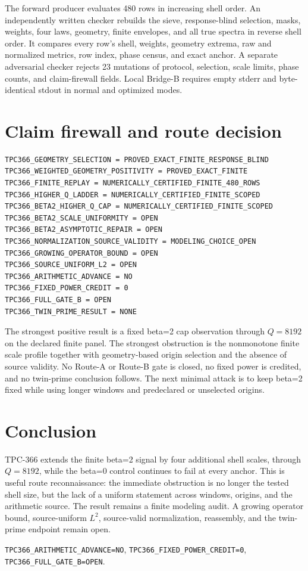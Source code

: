 \documentclass[10pt]{article}
\begin{document}
The forward producer evaluates 480 rows in increasing shell order.  An
independently written checker rebuilds the sieve, response-blind selection,
masks, weights, four laws, geometry, finite envelopes, and all true spectra
in reverse shell order.  It compares every row's shell, weights, geometry
extrema, raw and normalized metrics, row index, phase census, and exact
anchor.  A separate adversarial checker rejects 23 mutations of protocol,
selection, scale limits, phase counts, and claim-firewall fields.  Local
Bridge-B requires empty stderr and byte-identical stdout in normal and
optimized modes.

\section{Claim firewall and route decision}

\begin{verbatim}
TPC366_GEOMETRY_SELECTION = PROVED_EXACT_FINITE_RESPONSE_BLIND
TPC366_WEIGHTED_GEOMETRY_POSITIVITY = PROVED_EXACT_FINITE
TPC366_FINITE_REPLAY = NUMERICALLY_CERTIFIED_FINITE_480_ROWS
TPC366_HIGHER_Q_LADDER = NUMERICALLY_CERTIFIED_FINITE_SCOPED
TPC366_BETA2_HIGHER_Q_CAP = NUMERICALLY_CERTIFIED_FINITE_SCOPED
TPC366_BETA2_SCALE_UNIFORMITY = OPEN
TPC366_BETA2_ASYMPTOTIC_REPAIR = OPEN
TPC366_NORMALIZATION_SOURCE_VALIDITY = MODELING_CHOICE_OPEN
TPC366_GROWING_OPERATOR_BOUND = OPEN
TPC366_SOURCE_UNIFORM_L2 = OPEN
TPC366_ARITHMETIC_ADVANCE = NO
TPC366_FIXED_POWER_CREDIT = 0
TPC366_FULL_GATE_B = OPEN
TPC366_TWIN_PRIME_RESULT = NONE
\end{verbatim}

The strongest positive result is a fixed beta=2 cap observation through
$Q=8192$ on the declared finite panel.  The strongest obstruction is the
nonmonotone finite scale profile together with geometry-based origin
selection and the absence of source validity.  No Route-A or Route-B gate is
closed, no fixed power is credited, and no twin-prime conclusion follows.
The next minimal attack is to keep beta=2 fixed while using longer windows
and predeclared or unselected origins.

\section{Conclusion}

TPC-366 extends the finite beta=2 signal by four additional shell scales,
through $Q=8192$, while the beta=0 control continues to fail at every anchor.
This is useful route reconnaissance: the immediate obstruction is no longer
the tested shell size, but the lack of a uniform statement across windows,
origins, and the arithmetic source.  The result remains a finite modeling
audit.  A growing operator bound, source-uniform $L^2$, source-valid
normalization, reassembly, and the twin-prime endpoint remain open.

\begin{center}\small
\texttt{TPC366\_ARITHMETIC\_ADVANCE=NO},\quad
\texttt{TPC366\_FIXED\_POWER\_CREDIT=0},\quad
\texttt{TPC366\_FULL\_GATE\_B=OPEN}.
\end{center}
\end{document}
